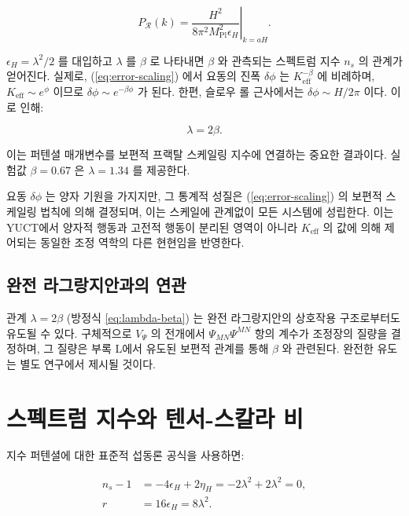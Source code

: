 \documentclass[11pt,a4paper]{article}
\theoremstyle{remark}
\newcommand{\Keff}{K_{\mathrm{eff}}}
\newcommand{\Mpl}{M_{\mathrm{Pl}}}
\newcommand{\rs}{r}
\begin{document}
	\begin{equation}
		P_{\mathcal{R}}(k) = \left. \frac{H^2}{8\pi^2 \Mpl^2 \epsilon_H} \right|_{k=aH}.
	\end{equation}
	
	$\epsilon_H = \lambda^2/2$ 를 대입하고 $\lambda$ 를 $\beta$ 로 나타내면 $\beta$ 와 관측되는 스펙트럼 지수 $n_s$ 의 관계가 얻어진다. 실제로, (\ref{eq:error-scaling}) 에서 요동의 진폭 $\delta \phi$ 는 $\Keff^{-\beta}$ 에 비례하며, $\Keff \sim e^{\phi}$ 이므로 $\delta \phi \sim e^{-\beta \phi}$ 가 된다. 한편, 슬로우 롤 근사에서는 $\delta \phi \sim H/2\pi$ 이다. 이로 인해:
	
	\begin{equation}
		\lambda = 2\beta.
		\label{eq:lambda-beta}
	\end{equation}
	
	이는 퍼텐셜 매개변수를 보편적 프랙탈 스케일링 지수에 연결하는 중요한 결과이다. 실험값 $\beta = 0.67$ 은 $\lambda = 1.34$ 를 제공한다.
	
	요동 $\delta\phi$ 는 양자 기원을 가지지만, 그 통계적 성질은 (\ref{eq:error-scaling}) 의 보편적 스케일링 법칙에 의해 결정되며, 이는 스케일에 관계없이 모든 시스템에 성립한다. 이는 YUCT에서 양자적 행동과 고전적 행동이 분리된 영역이 아니라 $K_{\mathrm{eff}}$ 의 값에 의해 제어되는 동일한 조정 역학의 다른 현현임을 반영한다.
	
	\subsection{완전 라그랑지안과의 연관}
	
	관계 $\lambda = 2\beta$ (방정식 \ref{eq:lambda-beta}) 는 완전 라그랑지안의 상호작용 구조로부터도 유도될 수 있다. 구체적으로 $V_{\Psi}$ 의 전개에서 $\Psi_{MN}\Psi^{MN}$ 항의 계수가 조정장의 질량을 결정하며, 그 질량은 부록 L에서 유도된 보편적 관계를 통해 $\beta$ 와 관련된다. 완전한 유도는 별도 연구에서 제시될 것이다.
	
	\section{스펙트럼 지수와 텐서-스칼라 비}
	\label{sec:predictions}
	
	지수 퍼텐셜에 대한 표준적 섭동론 공식을 사용하면:
	
	\begin{align}
		n_s - 1 &= -4\epsilon_H + 2\eta_H = -2\lambda^2 + 2\lambda^2 = 0, \\
		\rs &= 16\epsilon_H = 8\lambda^2.
	\end{align}
	
\end{document}
